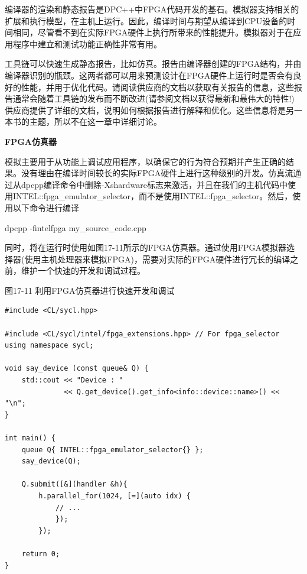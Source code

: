 编译器的渲染和静态报告是DPC++中FPGA代码开发的基石。模拟器支持相关的扩展和执行模型，在主机上运行。因此，编译时间与期望从编译到CPU设备的时间相同，尽管看不到在实际FPGA硬件上执行所带来的性能提升。模拟器对于在应用程序中建立和测试功能正确性非常有用。\par

工具链可以快速生成静态报告，比如仿真。报告由编译器创建的FPGA结构，并由编译器识别的瓶颈。这两者都可以用来预测设计在FPGA硬件上运行时是否会有良好的性能，并用于优化代码。请阅读供应商的文档以获取有关报告的信息，这些报告通常会随着工具链的发布而不断改进(请参阅文档以获得最新和最伟大的特性!)供应商提供了详细的文档，说明如何根据报告进行解释和优化。这些信息将是另一本书的主题，所以不在这一章中详细讨论。\par

\hspace*{\fill} \par %
\textbf{FPGA仿真器}

模拟主要用于从功能上调试应用程序，以确保它的行为符合预期并产生正确的结果。没有理由在编译时间较长的实际FPGA硬件上进行这种级别的开发。仿真流通过从dpcpp编译命令中删除-Xshardware标志来激活，并且在我们的主机代码中使用INTEL::fpga\_emulator\_selector，而不是使用INTEL::fpga\_selector。然后，使用以下命令进行编译\par

\begin{tcolorbox}[colback=white,colframe=black]
dpcpp -fintelfpga my\_source\_code.cpp
\end{tcolorbox}

同时，将在运行时使用如图17-11所示的FPGA仿真器。通过使用FPGA模拟器选择器(使用主机处理器来模拟FPGA)，需要对实际的FPGA硬件进行冗长的编译之前，维护一个快速的开发和调试过程。\par

\hspace*{\fill} \par %
图17-11 利用FPGA仿真器进行快速开发和调试
\begin{lstlisting}[caption={}]
#include <CL/sycl.hpp>

#include <CL/sycl/intel/fpga_extensions.hpp> // For fpga_selector
using namespace sycl;

void say_device (const queue& Q) {
	std::cout << "Device : "
			  << Q.get_device().get_info<info::device::name>() << "\n";
}

int main() {
	queue Q{ INTEL::fpga_emulator_selector{} };
	say_device(Q);
	
	Q.submit([&](handler &h){
		h.parallel_for(1024, [=](auto idx) {
			// ...
			});
		});

	return 0;
}
\end{lstlisting}

